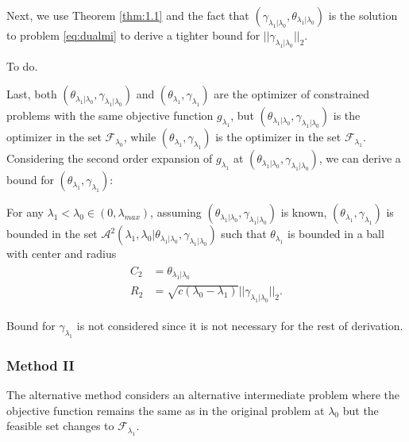 Next, we use Theorem \ref{thm:1.1} and the fact that $(\gamma_{\lambda_1|\lambda_0},\theta_{\lambda_1|\lambda_0})$ is the solution to problem \ref{eq:dualmi} to derive a tighter bound for $||\gamma_{\lambda_1|\lambda_0}||_2$.

\begin{theorem}
    \label{thm:1.2}
    To do.
\end{theorem}

Last, both $(\theta_{\lambda_1|\lambda_0},\gamma_{\lambda_1|\lambda_0})$ and $(\theta_{\lambda_1},\gamma_{\lambda_1})$ are the optimizer of constrained problems with the same objective function $g_{\lambda_1}$, but $(\theta_{\lambda_1|\lambda_0},\gamma_{\lambda_1|\lambda_0})$ is the optimizer in the set $\mathcal{F}_{\lambda_0}$, while $(\theta_{\lambda_1},\gamma_{\lambda_1})$ is the optimizer in the set $\mathcal{F}_{\lambda_1}$. Considering the second order expansion of $g_{\lambda_1}$ at $(\theta_{\lambda_1|\lambda_0},\gamma_{\lambda_1|\lambda_0})$, we can derive a bound for $(\theta_{\lambda_1},\gamma_{\lambda_1})$:

\begin{theorem}
    \label{thm:1.3}
    For any $\lambda_1<\lambda_{0}\in (0,\lambda_{max})$, assuming $(\theta_{\lambda_1|\lambda_0},\gamma_{\lambda_1|\lambda_0})$ is known, $(\theta_{\lambda_1},\gamma_{\lambda_1})$ is bounded in the set $\mathcal{A}^2(\lambda_1,\lambda_0|\theta_{\lambda_1|\lambda_0},\gamma_{\lambda_1|\lambda_0})$ such that $\theta_{\lambda_1}$ is bounded in a ball with center and radius
    \begin{gather}
        \begin{aligned}
            C_2&=\theta_{\lambda_1|\lambda_0}\\
            R_2&=\sqrt{c(\lambda_0-\lambda_1)}||\gamma_{\lambda_1|\lambda_0}||_2.
        \end{aligned}
    \end{gather}
\end{theorem}

Bound for $\gamma_{\lambda_1}$ is not considered since it is not necessary for the rest of derivation.

\subsubsection{Method II}

The alternative method considers an alternative intermediate problem where the objective function remains the same as in the original problem at $\lambda_0$ but the feasible set changes to $\mathcal{F}_{\lambda_1}$.

